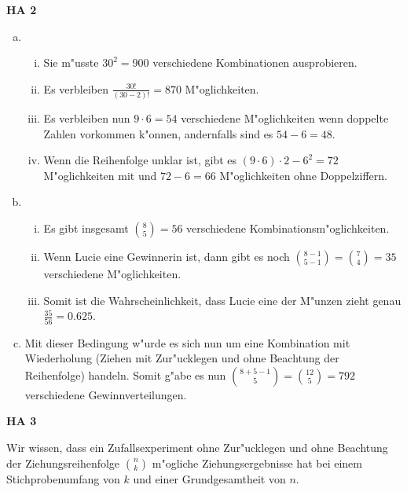 \documentclass[a4paper,12pt]{article}
\newcommand{\Aufgabe}[1]{
        {
        \vspace*{0.5cm}
        \textbf{HA #1}
        \vspace*{0.2cm}
    }
}
\begin{document}
    \Aufgabe{2}
    \begin{enumerate}[(a)]
        \item
        \begin{enumerate}[i.]
            \item
            Sie m"usste $ 30^2 = 900 $ verschiedene Kombinationen ausprobieren.

            \item
            Es verbleiben $ \frac{30!}{(30 - 2)!}  = 870 $ M"oglichkeiten.

            \item 
            Es verbleiben nun $ 9 \cdot 6 = 54 $ verschiedene M"oglichkeiten wenn doppelte Zahlen vorkommen k"onnen, andernfalls sind es $ 54 - 6 = 48 $.

            \item
            Wenn die Reihenfolge unklar ist, gibt es $ (9 \cdot 6) \cdot 2 - 6^2 = 72 $ M"oglichkeiten mit und $ 72 - 6 = 66 $ M"oglichkeiten ohne Doppelziffern.
        \end{enumerate}

        \item
        \begin{enumerate}[i.]
            \item 
            Es gibt insgesamt $ \binom{8}{5} = 56 $ verschiedene Kombinationsm"oglichkeiten.

            \item 
            Wenn Lucie eine Gewinnerin ist, dann gibt es noch $ \binom{8 - 1}{5 - 1} = \binom{7}{4} = 35 $ verschiedene M"oglichkeiten.
            
            \item
            Somit ist die Wahrscheinlichkeit, dass Lucie eine der M"unzen zieht genau $ \frac{35}{56} = 0.625 $.
        \end{enumerate}

        \item
        Mit dieser Bedingung w"urde es sich nun um eine Kombination mit Wiederholung (Ziehen mit Zur"ucklegen und ohne Beachtung der Reihenfolge) handeln.
        Somit g"abe es nun $ \binom{8 + 5 - 1}{5} = \binom{12}{5} = 792 $ verschiedene Gewinnverteilungen.
    \end{enumerate}

    \Aufgabe{3}

    Wir wissen, dass ein Zufallsexperiment ohne Zur"ucklegen und ohne Beachtung der Ziehungsreihenfolge $ \binom{n}{k} $ m"ogliche Ziehungsergebnisse
    hat bei einem Stichprobenumfang von $ k $ und einer Grundgesamtheit von $ n $.
    
\end{document}

